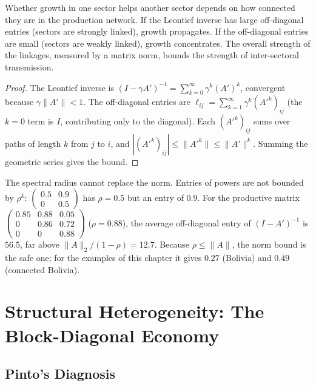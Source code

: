 \documentclass[../structural_economics_book.tex]{subfiles}
\begin{document}
\begin{intuition}
Whether growth in one sector helps another sector depends on how connected they are in the production network. If the Leontief inverse has large off-diagonal entries (sectors are strongly linked), growth propagates. If the off-diagonal entries are small (sectors are weakly linked), growth concentrates. The overall strength of the linkages, measured by a matrix norm, bounds the strength of inter-sectoral transmission.
\end{intuition}

\begin{proof}
The Leontief inverse is $(I - \gamma A')^{-1} = \sum_{k=0}^\infty \gamma^k (A')^k$, convergent because $\gamma\|A'\| < 1$. The off-diagonal entries are $\ell_{ij} = \sum_{k=1}^\infty \gamma^k (A'^k)_{ij}$ (the $k=0$ term is $I$, contributing only to the diagonal). Each $(A'^k)_{ij}$ sums over paths of length $k$ from $j$ to $i$, and $|(A'^k)_{ij}| \leq \|A'^k\| \leq \|A'\|^k$. Summing the geometric series gives the bound.
\end{proof}

The spectral radius cannot replace the norm. Entries of powers are not bounded by $\rho^k$: $\begin{pmatrix} 0.5 & 0.9 \\ 0 & 0.5\end{pmatrix}$ has $\rho = 0.5$ but an entry of $0.9$. For the productive matrix $\begin{pmatrix} 0.85 & 0.88 & 0.05 \\ 0 & 0.86 & 0.72 \\ 0 & 0 & 0.88\end{pmatrix}$ ($\rho = 0.88$), the average off-diagonal entry of $(I - A')^{-1}$ is $56.5$, far above $\|A\|_2/(1 - \rho) = 12.7$. Because $\rho \le \|A\|$, the norm bound is the safe one; for the examples of this chapter it gives $0.27$ (Bolivia) and $0.49$ (connected Bolivia).


\section{Structural Heterogeneity: The Block-Diagonal Economy}
\label{ch03:sec:heterogeneity}

\subsection{Pinto's Diagnosis}
\end{document}
